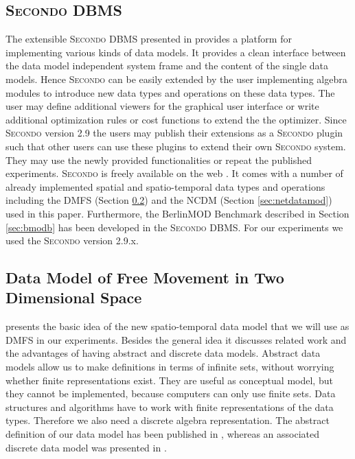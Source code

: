 \documentclass[a4paper]{article}
\newcommand{\secondo}{\textsc{Secondo}}
\newcommand{\bmodb} {BerlinMOD Benchmark}
\newcommand{\secver}{2.9.x}
\begin{document}
\subsection{\secondo{} DBMS}
\label{sec:secondo}
The extensible \secondo{} DBMS presented in
\cite{SecondoEnvironmentDieker,SecondoPlatformPrototypingGueting} provides a
platform for implementing various kinds of data models. It provides a clean
interface between the data model independent system frame and the content of the
single data models. Hence \secondo{} can be easily extended by the user
implementing algebra modules to introduce new data types and operations on
these data types. The user may define additional viewers for the graphical user
interface or write additional optimization rules or cost functions to extend the
the optimizer. Since \secondo{} version 2.9 the users may publish their extensions
as a \secondo{} plugin such that other users can use these plugins to extend their own
\secondo{} system. They may use the newly provided functionalities or repeat the
published experiments. \secondo{} is freely available on the web \cite{secondoweb}.
It comes with a number of already implemented spatial and spatio-temporal data types
and operations including the DMFS (Section \ref{sec:bmodbdatamod}) and the NCDM
(Section \ref{sec:netdatamod}) used in this paper. Furthermore, the \bmodb{}
described in Section \ref{sec:bmodb} has been developed in the \secondo{} DBMS.
For our experiments we used the \secondo{} version \secver{}.
\subsection{Data Model of Free Movement in Two Dimensional Space}
\label{sec:bmodbdatamod}
\cite{STDTModelingQueryingMOinDErwig} presents the basic idea of the new
spatio-temporal data model that we will use as DMFS in our experiments. Besides
the general idea it discusses related work and the advantages of having abstract
and discrete data models. Abstract data models allow us to make definitions
in terms of infinite sets, without worrying whether finite representations exist.
They are useful as conceptual model, but they cannot be implemented, because computers
can only use finite sets. Data structures and algorithms have to work with finite
representations of the data types. Therefore we also need a discrete algebra
representation. The abstract definition of our data model has been published in
\cite{RepresentingMovingObjectsGueting}, whereas an associated discrete data
model was presented in \cite{DataModelDataStructureGueting}.
\end{document}
